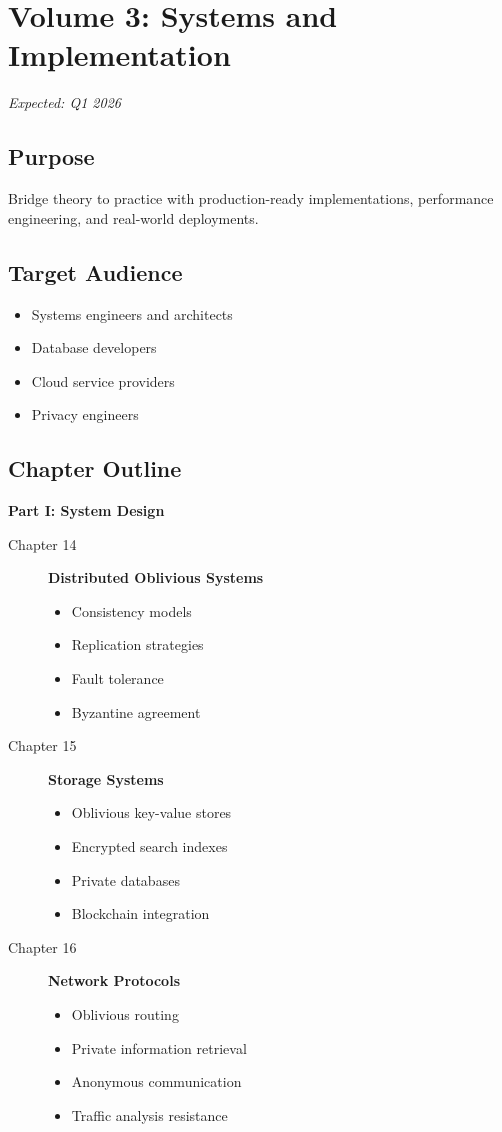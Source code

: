 \section{Volume 3: Systems and Implementation}

\textit{Expected: Q1 2026}

\subsection{Purpose}
Bridge theory to practice with production-ready implementations, performance engineering, and real-world deployments.

\subsection{Target Audience}
\begin{itemize}
\item Systems engineers and architects
\item Database developers
\item Cloud service providers
\item Privacy engineers
\end{itemize}

\subsection{Chapter Outline}

\textbf{Part I: System Design}
\begin{description}
\item[Chapter 14] \textbf{Distributed Oblivious Systems}
    \begin{itemize}
    \item Consistency models
    \item Replication strategies
    \item Fault tolerance
    \item Byzantine agreement
    \end{itemize}

\item[Chapter 15] \textbf{Storage Systems}
    \begin{itemize}
    \item Oblivious key-value stores
    \item Encrypted search indexes
    \item Private databases
    \item Blockchain integration
    \end{itemize}

\item[Chapter 16] \textbf{Network Protocols}
    \begin{itemize}
    \item Oblivious routing
    \item Private information retrieval
    \item Anonymous communication
    \item Traffic analysis resistance
    \end{itemize}
\end{description}

